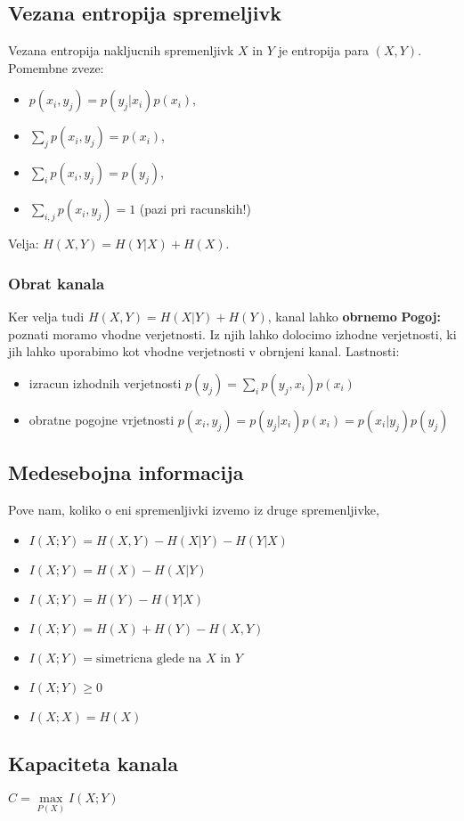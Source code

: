 \documentclass{article}
\begin{document}
\begin{multicols}{4}
\subsection{Vezana entropija spremeljivk}
Vezana entropija nakljucnih spremenljivk $X$ in $Y$ je entropija para $(X, Y)$.
Pomembne zveze:
\begin{itemize}
    \item $p(x_i, y_j) = p(y_j| x_i)p(x_i)$,
    \item $\sum_j p(x_i, y_j) = p(x_i)$,
    \item $\sum_i p(x_i, y_j) = p(y_j)$,
    \item $\sum_{i,j} p(x_i, y_j) = 1$ (pazi pri racunskih!)
\end{itemize}
Velja: $H(X, Y) = H(Y|X) + H(X)$.
\subsubsection{Obrat kanala}
Ker velja tudi $H(X, Y) = H(X|Y) + H(Y)$, kanal lahko \textbf{obrnemo}
\textbf{Pogoj:}  poznati moramo vhodne verjetnosti. Iz njih lahko dolocimo izhodne verjetnosti, ki jih lahko
uporabimo kot vhodne verjetnosti v obrnjeni kanal.
Lastnosti:
\begin{itemize}
    \item izracun izhodnih verjetnosti $p(y_j) = \sum_i p(y_j, x_i)p(x_i)$
    \item obratne pogojne vrjetnosti $p(x_i, y_j)= p(y_j|x_i)p(x_i) = p(x_i|y_j)p(y_j)$
\end{itemize}

\subsection{Medesebojna informacija}
Pove nam, koliko o eni spremenljivki izvemo iz druge spremenljivke,
\begin{itemize}
    \item $I(X;Y) = H(X, Y) - H(X|Y) - H(Y|X)$
    \item $I(X;Y) = H(X) - H(X|Y)$
    \item $I(X;Y) = H(Y) - H(Y|X)$
    \item $I(X;Y) = H(X) + H(Y) - H(X, Y)$
    \item $I(X;Y) = \text{simetricna glede na } X \text{ in } Y$
    \item $I(X;Y) \geq 0$
    \item $I(X;X) = H(X)$
\end{itemize}

\subsection{Kapaciteta kanala}
\begin{center}
    $C =\underset{P(X)}{\max} I(X;Y)$
\end{center}

\end{multicols}
\end{document}
